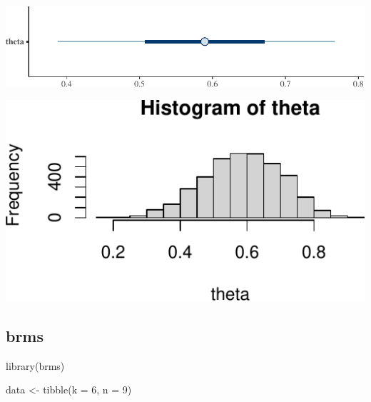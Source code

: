 \documentclass[]{tufte-handout}
\newenvironment{Shaded}{}{}
\newcommand{\AttributeTok}[1]{\textcolor[rgb]{0.49,0.56,0.16}{#1}}
\newcommand{\DecValTok}[1]{\textcolor[rgb]{0.25,0.63,0.44}{#1}}
\newcommand{\FunctionTok}[1]{\textcolor[rgb]{0.02,0.16,0.49}{#1}}
\newcommand{\NormalTok}[1]{#1}
\newcommand{\OtherTok}[1]{\textcolor[rgb]{0.00,0.44,0.13}{#1}}
\newcommand{\SpecialCharTok}[1]{\textcolor[rgb]{0.25,0.44,0.63}{#1}}
\newcommand{\StringTok}[1]{\textcolor[rgb]{0.25,0.44,0.63}{#1}}
\begin{document}
\includegraphics{01-intro-bayesian-stats_files/figure-latex/unnamed-chunk-29-1}

\begin{Shaded}
\end{Shaded}

\includegraphics{01-intro-bayesian-stats_files/figure-latex/unnamed-chunk-30-1}

\hypertarget{brms}{%
\subsection{brms}\label{brms}}

\begin{Shaded}
\begin{Highlighting}[]
\FunctionTok{library}\NormalTok{(brms)}
\end{Highlighting}
\end{Shaded}

\begin{Shaded}
\begin{Highlighting}[]
\NormalTok{data }\OtherTok{\textless{}{-}} \FunctionTok{tibble}\NormalTok{(}\AttributeTok{k =} \DecValTok{6}\NormalTok{, }\AttributeTok{n =} \DecValTok{9}\NormalTok{)}
\end{Highlighting}
\end{Shaded}
\end{document}
